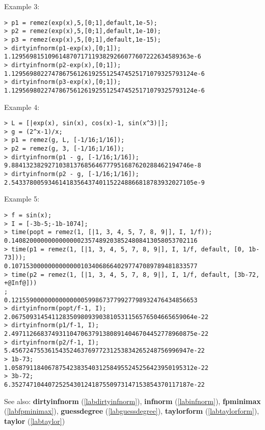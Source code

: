 \noindent Example 3: 
\begin{center}\begin{minipage}{15cm}\begin{Verbatim}[frame=single,commandchars=\\\|\~]
> p1 = remez(exp(x),5,[0;1],default,1e-5);
> p2 = remez(exp(x),5,[0;1],default,1e-10);
> p3 = remez(exp(x),5,[0;1],default,1e-15);
> dirtyinfnorm(p1-exp(x),[0;1]);
1.1295698151096148707171193829266077607222634589363e-6
> dirtyinfnorm(p2-exp(x),[0;1]);
1.12956980227478675612619255125474525171079325793124e-6
> dirtyinfnorm(p3-exp(x),[0;1]);
1.12956980227478675612619255125474525171079325793124e-6
\end{Verbatim}
\end{minipage}\end{center}
\noindent Example 4: 
\begin{center}\begin{minipage}{15cm}\begin{Verbatim}[frame=single,commandchars=\\\|\~]
> L = [|exp(x), sin(x), cos(x)-1, sin(x^3)|];
> g = (2^x-1)/x;
> p1 = remez(g, L, [-1/16;1/16]);
> p2 = remez(g, 3, [-1/16;1/16]);
> dirtyinfnorm(p1 - g, [-1/16;1/16]);
9.8841323829271038137685646777951687620288462194746e-8
> dirtyinfnorm(p2 - g, [-1/16;1/16]);
2.54337800593461418356437401152248866818783932027105e-9
\end{Verbatim}
\end{minipage}\end{center}
\noindent Example 5: 
\begin{center}\begin{minipage}{15cm}\begin{Verbatim}[frame=single,commandchars=\\\|\~]
> f = sin(x);
> I = [-3b-5;-1b-1074];
> time(popt = remez(1, [|1, 3, 4, 5, 7, 8, 9|], I, 1/f));
0.140820000000000000023574892038524808413058053702116
> time(p1 = remez(1, [|1, 3, 4, 5, 7, 8, 9|], I, 1/f, default, [0, 1b-73]));
0.107153000000000000010340686640297747089789481833577
> time(p2 = remez(1, [|1, 3, 4, 5, 7, 8, 9|], I, 1/f, default, [3b-72, +@Inf@]))
;
0.121559000000000000005998673779927798932476434856653
> dirtyinfnorm(popt/f-1, I);
2.06750931454112835098093903810531156576504665659064e-22
> dirtyinfnorm(p1/f-1, I);
2.49711266837493110470637913808914046704452778960875e-22
> dirtyinfnorm(p2/f-1, I);
5.4567247553615435246376977231253834265248756996947e-22
> 1b-73;
1.05879118406787542383540312584955245256423950195312e-22
> 3b-72;
6.3527471044072525430124187550973147153854370117187e-22
\end{Verbatim}
\end{minipage}\end{center}
See also: \textbf{dirtyinfnorm} (\ref{labdirtyinfnorm}), \textbf{infnorm} (\ref{labinfnorm}), \textbf{fpminimax} (\ref{labfpminimax}), \textbf{guessdegree} (\ref{labguessdegree}), \textbf{taylorform} (\ref{labtaylorform}), \textbf{taylor} (\ref{labtaylor})
